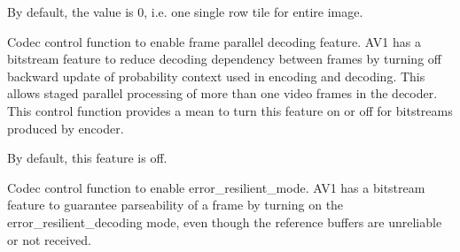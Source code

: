 \begin{Desc}
\begin{description}
By default, the value is 0, i.\+e. one single row tile for entire image. \item[{\em 
A\+V1\+E\+\_\+\+S\+E\+T\+\_\+\+F\+R\+A\+M\+E\+\_\+\+P\+A\+R\+A\+L\+L\+E\+L\+\_\+\+D\+E\+C\+O\+D\+I\+NG\hypertarget{group__aom__encoder_ggae78dde67a6d78f332e9bdba0dde42db5a465382b6bbca24467739c3c1b94e6483}{}\label{group__aom__encoder_ggae78dde67a6d78f332e9bdba0dde42db5a465382b6bbca24467739c3c1b94e6483}
}]Codec control function to enable frame parallel decoding feature. A\+V1 has a bitstream feature to reduce decoding dependency between frames by turning off backward update of probability context used in encoding and decoding. This allows staged parallel processing of more than one video frames in the decoder. This control function provides a mean to turn this feature on or off for bitstreams produced by encoder.

By default, this feature is off. \item[{\em 
A\+V1\+E\+\_\+\+S\+E\+T\+\_\+\+E\+R\+R\+O\+R\+\_\+\+R\+E\+S\+I\+L\+I\+E\+N\+T\+\_\+\+M\+O\+DE\hypertarget{group__aom__encoder_ggae78dde67a6d78f332e9bdba0dde42db5aa0d049453fced5f8079861b16e356c69}{}\label{group__aom__encoder_ggae78dde67a6d78f332e9bdba0dde42db5aa0d049453fced5f8079861b16e356c69}
}]Codec control function to enable error\+\_\+resilient\+\_\+mode. A\+V1 has a bitstream feature to guarantee parseability of a frame by turning on the error\+\_\+resilient\+\_\+decoding mode, even though the reference buffers are unreliable or not received.


\end{description}
\end{Desc}
